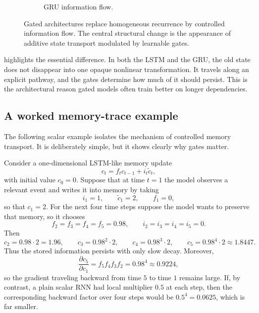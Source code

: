 \begin{figure}[t]
\begin{subfigure}[t]{0.48\textwidth}
\caption{GRU information flow.}
\end{subfigure}
\caption{Gated architectures replace homogeneous recurrence by controlled information flow.
The central structural change is the appearance of additive state transport modulated by learnable gates.}
\label{fig:gated-information-flow}
\end{figure}

 highlights the essential difference.
In both the LSTM and the GRU, the old state does not disappear into one opaque nonlinear transformation.
It travels along an explicit pathway, and the gates determine how much of it should persist.
This is the architectural reason gated models often train better on longer dependencies.

\subsection*{A worked memory-trace example}

The following scalar example isolates the mechanism of controlled memory transport.
It is deliberately simple, but it shows clearly why gates matter.

\begin{example}
Consider a one-dimensional LSTM-like memory update
\[
 c_t = f_t c_{t-1} + i_t \widetilde c_t,
\]
with initial value $c_0=0$.
Suppose that at time $t=1$ the model observes a relevant event and writes it into memory by taking
\[
 i_1 = 1,
 \qquad
 \widetilde c_1 = 2,
 \qquad
 f_1 = 0,
\]
so that $c_1=2$.
For the next four time steps suppose the model wants to preserve that memory, so it chooses
\[
 f_2=f_3=f_4=f_5=0.98,
 \qquad
 i_2=i_3=i_4=i_5=0.
\]
Then
\[
 c_2 = 0.98\cdot 2 = 1.96,
 \qquad
 c_3 = 0.98^2\cdot 2,
 \qquad
 c_4 = 0.98^3\cdot 2,
 \qquad
 c_5 = 0.98^4\cdot 2 \approx 1.8447.
\]
Thus the stored information persists with only slow decay.
Moreover,
\[
 \frac{\partial c_5}{\partial c_1} = f_5 f_4 f_3 f_2 = 0.98^4 \approx 0.9224,
\]
so the gradient traveling backward from time $5$ to time $1$ remains large.
If, by contrast, a plain scalar RNN had local multiplier $0.5$ at each step, then the corresponding backward factor over four steps would be $0.5^4=0.0625$, which is far smaller.
\end{example}

